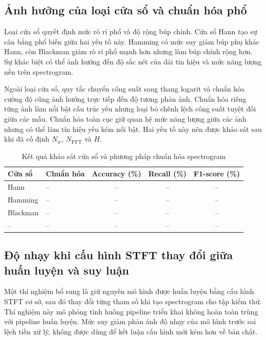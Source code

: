 \documentclass[../DoAn.tex]{subfiles}
\begin{document}
\subsection{Ảnh hưởng của loại cửa sổ và chuẩn hóa phổ}

Loại cửa sổ quyết định mức rò rỉ phổ và độ rộng búp chính. Cửa sổ Hann tạo sự cân bằng phổ biến giữa hai yếu tố này. Hamming có mức suy giảm búp phụ khác Hann, còn Blackman giảm rò rỉ phổ mạnh hơn nhưng làm búp chính rộng hơn. Sự khác biệt có thể ảnh hưởng đến độ sắc nét của dải tín hiệu và mức năng lượng nền trên spectrogram.

Ngoài loại cửa sổ, quy tắc chuyển công suất sang thang logarit và chuẩn hóa cường độ cũng ảnh hưởng trực tiếp đến độ tương phản ảnh. Chuẩn hóa riêng từng ảnh làm nổi bật cấu trúc yếu nhưng loại bỏ chênh lệch công suất tuyệt đối giữa các mẫu. Chuẩn hóa toàn cục giữ quan hệ mức năng lượng giữa các ảnh nhưng có thể làm tín hiệu yếu kém nổi bật. Hai yếu tố này nên được khảo sát sau khi đã cố định $N_w$, $N_{\mathrm{FFT}}$ và $H$.

\begin{table}[H]
    \centering
    \caption{Kết quả khảo sát cửa sổ và phương pháp chuẩn hóa spectrogram}
    \label{tab:stft_window_normalization_results}
    \renewcommand{\arraystretch}{1.3}
    \begin{tabular}{|p{}|p{}|c|c|c|}
        \hline
        \textbf{Cửa sổ} & \textbf{Chuẩn hóa} & \textbf{Accuracy (\%)} & \textbf{Recall (\%)} & \textbf{F1-score (\%)} \\ \hline
        Hann & -- & -- & -- & -- \\ \hline
        Hamming & -- & -- & -- & -- \\ \hline
        Blackman & -- & -- & -- & -- \\ \hline
        -- & -- & -- & -- & -- \\ \hline
    \end{tabular}
\end{table}

\subsection{Độ nhạy khi cấu hình STFT thay đổi giữa huấn luyện và suy luận}

Một thí nghiệm bổ sung là giữ nguyên mô hình được huấn luyện bằng cấu hình STFT cơ sở, sau đó thay đổi từng tham số khi tạo spectrogram cho tập kiểm thử. Thí nghiệm này mô phỏng tình huống pipeline triển khai không hoàn toàn trùng với pipeline huấn luyện. Mức suy giảm phản ánh độ nhạy của mô hình trước sai lệch tiền xử lý, không được dùng để kết luận cấu hình mới kém hơn về bản chất.
\end{document}
